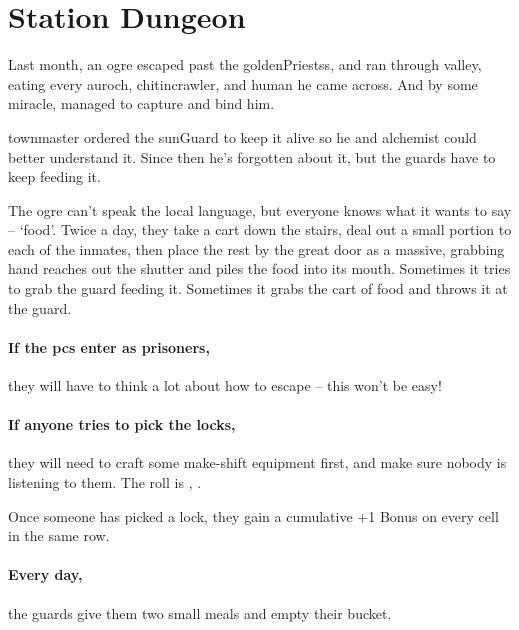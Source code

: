 \prisonMap

\section{Station Dungeon}
\label{stationDungeon}

\begin{multicols}{2}

\begin{exampletext}
  Last month, an ogre escaped past the \glspl{goldenPriests}, and ran through \gls{valley}, eating every auroch, chitincrawler, and human he came across.
  And by some miracle,  managed to capture and bind him.

  \Gls{townmaster} ordered the \gls{sunGuard} to keep it alive so he and \gls{alchemist} could better understand it.
  Since then he's forgotten about it, but the guards have to keep feeding it.

  The ogre can't speak the local language, but everyone knows what it wants to say -- `food'.
  Twice a day, they take a cart down the stairs, deal out a small portion to each of the inmates, then place the rest by the great door as a massive, grabbing hand reaches out the shutter and piles the food into its mouth.
  Sometimes it tries to grab the guard feeding it.
  Sometimes it grabs the cart of food and throws it at the guard.
\end{exampletext}

\paragraph{If the \glspl{pc} enter as prisoners,}
they will have to think a lot about how to escape -- this won't be easy!

\paragraph{If anyone tries to pick the locks,}
they will need to craft some make-shift equipment first, and make sure nobody is listening to them.
The roll is , \tn[12].

Once someone has picked a lock, they gain a cumulative +1 Bonus on every cell in the same row.

\paragraph{Every day,}
the guards give them two small meals and empty their bucket.


\end{multicols}
